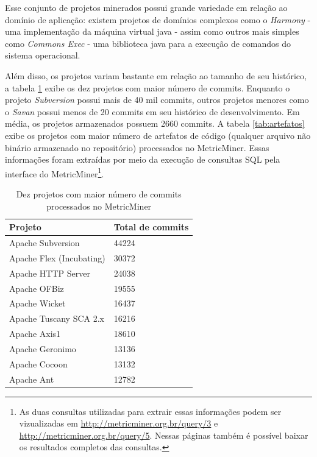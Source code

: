 \documentclass[a4paper, 12pt, twoside]{book}
\begin{document}
        Esse conjunto de projetos minerados possui grande variedade em relação ao domínio de aplicação: existem projetos de domínios complexos como o \textit{Harmony} - uma implementação da máquina virtual java - assim como outros mais simples como \textit{Commons Exec} - uma biblioteca java para a execução de comandos do sistema operacional. 

        Além disso, os projetos variam bastante em relação ao tamanho de seu histórico, a tabela \ref{tab:commits} exibe os dez projetos com maior número de commits. Enquanto o projeto \textit{Subversion} possui mais de 40 mil commits, outros projetos menores como o \textit{Savan} possui menos de 20 commits em seu histórico de desenvolvimento. Em média, os projetos armazenados possuem 2660 commits. A tabela \ref{tab:artefatos} exibe os projetos com maior número de artefatos de código (qualquer arquivo não binário armazenado no repositório) processados no MetricMiner. Essas informações foram extraídas por meio da execução de consultas SQL pela interface do MetricMiner\footnote{As duas consultas utilizadas para extrair essas informações podem ser vizualizadas em \url{http://metricminer.org.br/query/3} e \url{http://metricminer.org.br/query/5}. Nessas páginas também é possível baixar os resultados completos das consultas.}.

        \begin{table}\begin{center}
        \begin{tabular}{| p{5cm} | p{8.5cm} |}
            \hline                        
            \textbf{Projeto} & \textbf{Total de commits} \\
            \hline                        
            Apache Subversion & 44224 \\
            \hline
            Apache Flex (Incubating) & 30372 \\
            \hline
            Apache HTTP Server & 24038 \\
            \hline
            Apache OFBiz & 19555 \\
            \hline
            Apache Wicket & 16437 \\
            \hline
            Apache Tuscany SCA 2.x & 16216 \\
            \hline
            Apache Axis1 & 18610 \\
            \hline
            Apache Geronimo & 13136 \\
            \hline
            Apache Cocoon & 13132 \\
            \hline
            Apache Ant & 12782 \\
            \hline
        \end{tabular}
        \caption{Dez projetos com maior número de commits processados no MetricMiner \label{tab:commits}}
        \end{center}\end{table}
\end{document}
